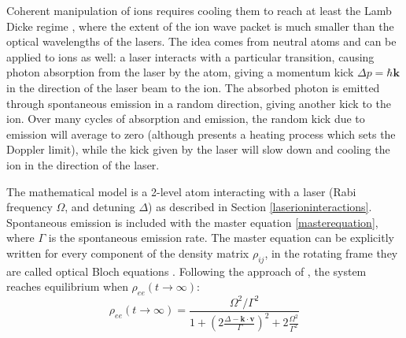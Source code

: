 Coherent manipulation of ions requires cooling them to reach at least the Lamb Dicke regime \cite{Wineland1998}, where the extent of the ion wave packet is much smaller than the optical wavelengths of the lasers. The idea comes from neutral atoms \cite{1975OptCo..13...68H} and can be applied to ions as well: a laser interacts with a particular transition, causing photon absorption from the laser by the atom, giving a momentum kick $\Delta p = \hbar \mathbf{k}$ in the direction of the laser beam to the ion. The absorbed photon is emitted through spontaneous emission in a random direction, giving another kick to the ion. Over many cycles of absorption and emission, the random kick due to emission will average to zero (although presents a heating process which sets the Doppler limit), while the kick given by the laser will slow down and cooling the ion in the direction of the laser. \par
The mathematical model is a 2-level atom interacting with a laser (Rabi frequency $\Omega$, and detuning $\Delta$) as described in Section \ref{laserioninteractions}. Spontaneous emission is included with the master equation \eqref{masterequation}, where $\Gamma$ is the spontaneous emission rate. The master equation can be explicitly written for every component of the density matrix $\rho_{ij}$, in the rotating frame they are called optical Bloch equations \cite{foot}. Following the approach of \cite{gabriel}, the system reaches equilibrium when $\rho_{ee}(t\to \infty)$:
\begin{equation}
\rho_{ee}(t\to \infty) = \frac{\Omega^2/\Gamma^2}{1 + \left(2\frac{\Delta -\mathbf{k}\cdot \mathbf{v}}{\Gamma}\right)^2 + 2\frac{\Omega^2}{\Gamma^2}}
\end{equation}

